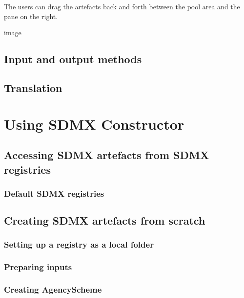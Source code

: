 \documentclass[
]{book}
\theoremstyle{definition}
\theoremstyle{definition}
\theoremstyle{definition}
\theoremstyle{definition}
\theoremstyle{remark}
\begin{document}
The users can drag the artefacts back and forth between the pool area and the pane on the right.

image

\hypertarget{input-and-output-methods}{%
\section{Input and output methods}\label{input-and-output-methods}}

\hypertarget{translation}{%
\section{Translation}\label{translation}}

\hypertarget{using-sdmx}{%
\chapter{Using SDMX Constructor}\label{using-sdmx}}

\hypertarget{accessing-sdmx}{%
\section{Accessing SDMX artefacts from SDMX registries}\label{accessing-sdmx}}

\hypertarget{default-sdmx-registries}{%
\subsection{Default SDMX registries}\label{default-sdmx-registries}}

\hypertarget{creating-sdmx}{%
\section{Creating SDMX artefacts from scratch}\label{creating-sdmx}}

\hypertarget{setting-up}{%
\subsection{Setting up a registry as a local folder}\label{setting-up}}

\hypertarget{preparing-inputs}{%
\subsection{Preparing inputs}\label{preparing-inputs}}

\hypertarget{creating-agencyscheme}{%
\subsection{Creating AgencyScheme}\label{creating-agencyscheme}}
\end{document}
